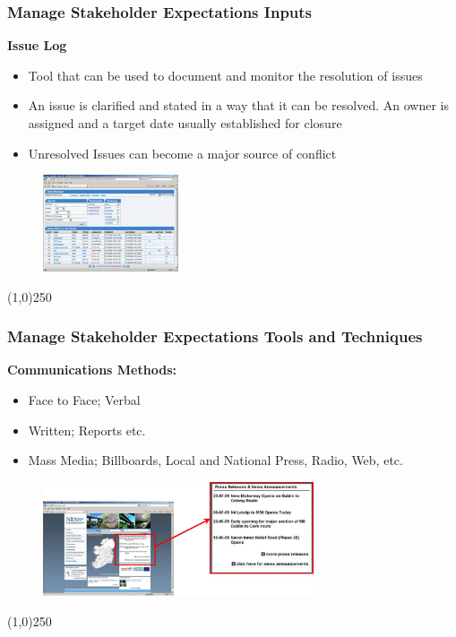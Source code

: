 \begin{frame}
\frametitle{Manage Stakeholder Expectations \hfill\hfill Inputs}
\textbf{Issue Log}\\
\begin{itemize}
	\item Tool that can be used to document and monitor the resolution of issues
	\item An issue is clarified and stated in a way that it can be resolved.  An owner is assigned and a target date usually established for closure
	\item Unresolved Issues can become a major source of conflict
\end{itemize}
\begin{figure}
	\centering
		\includegraphics[width = 4cm]{images/issuemanager.jpg}
	\label{fig:issuemanager}
\end{figure}
\end{frame}\begin{center}\line(1,0){250}\end{center}




\begin{frame}
\frametitle{Manage Stakeholder Expectations \hfill\hfill Tools and Techniques}
\textbf{Communications Methods:}
\begin{itemize}
	\item Face to Face; Verbal
	\item Written; Reports etc.
	\item Mass Media; Billboards, Local and National Press, Radio, Web, etc.
\end{itemize}
\begin{figure}
	\centering
		\includegraphics[width = 8cm]{images/nra.jpg}
	\label{fig:nra}
\end{figure}
\end{frame}\begin{center}\line(1,0){250}\end{center}



